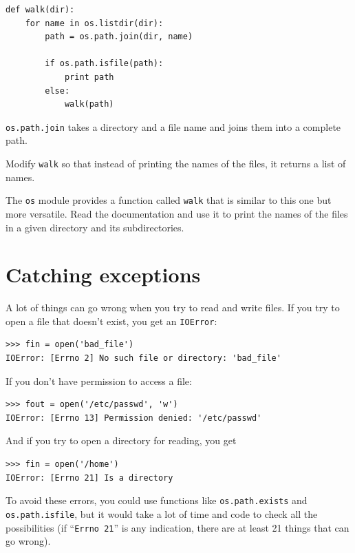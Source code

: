 \documentclass[10pt]{book}
\begin{document}
{

\beforeverb
\begin{verbatim}
def walk(dir):
    for name in os.listdir(dir):
        path = os.path.join(dir, name)

        if os.path.isfile(path):
            print path
        else:
            walk(path)
\end{verbatim}
\afterverb
%
{\tt os.path.join} takes a directory and a file name and joins
them into a complete path.  

\begin{ex}
Modify {\tt walk} so that instead of printing the names of
the files, it returns a list of names.
\end{ex}

\begin{ex}
The {\tt os} module provides a function called {\tt walk}
that is similar to this one but more versatile.  Read
the documentation and use it to print the names of the
files in a given directory and its subdirectories.
\end{ex}


\section{Catching exceptions}
\label{catch}

A lot of things can go wrong when you try to read and write
files.  If you try to open a file that doesn't exist, you get an
{\tt IOError}:


\beforeverb
\begin{verbatim}
>>> fin = open('bad_file')
IOError: [Errno 2] No such file or directory: 'bad_file'
\end{verbatim}
\afterverb
%
If you don't have permission to access a file:


\beforeverb
\begin{verbatim}
>>> fout = open('/etc/passwd', 'w')
IOError: [Errno 13] Permission denied: '/etc/passwd'
\end{verbatim}
\afterverb
%
And if you try to open a directory for reading, you get

\beforeverb
\begin{verbatim}
>>> fin = open('/home')
IOError: [Errno 21] Is a directory
\end{verbatim}
\afterverb
%
To avoid these errors, you could use functions like {\tt os.path.exists}
and {\tt os.path.isfile}, but it would take a lot of time and code
to check all the possibilities (if ``{\tt Errno 21}'' is any
indication, there are at least 21 things that can go wrong).

}
\end{document}
